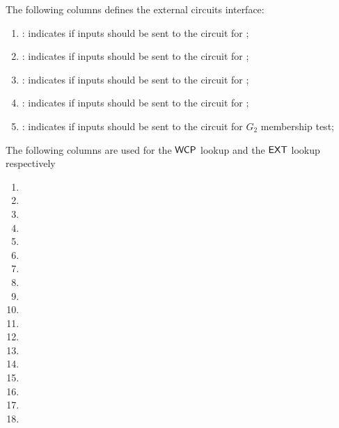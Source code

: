 The following columns defines the external circuits interface:
\begin{enumerate}[resume]
      \item \both{\csEcrecover}: indicates if inputs should be sent to the circuit for ;
      \item \both{\csEcadd}: indicates if inputs should be sent to the circuit for ;
      \item \both{\csEcmul}: indicates if inputs should be sent to the circuit for ;
      \item \both{\csEcpairing}: indicates if inputs should be sent to the circuit for ;
      \item \both{\csGTwo}: indicates if inputs should be sent to the circuit for $G_2$ membership test;
\end{enumerate}
The following columns are used for the $\textsf{WCP}$ lookup and the $\textsf{EXT}$ lookup respectively
\begin{multicols}{2}
      \begin{enumerate}[resume]
            \item \wcpFlag
            \item \wcpArgOneHi
            \item \wcpArgOneLo
            \item \wcpArgTwoHi
            \item \wcpArgTwoLo
            \item \wcpRes
            \item \wcpInst
            \item \extFlag
            \item \extArgOneHi
            \item \extArgOneLo
            \item \extArgTwoHi
            \item \extArgTwoLo
            \item \extArgThreeHi
            \item \extArgThreeLo
            \item \extResHi
            \item \extResLo
            \item \extInst
            \item[\vspace{\fill}]
      \end{enumerate}
\end{multicols}
